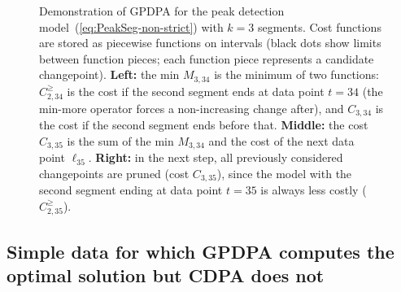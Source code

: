 \documentclass[twoside,11pt]{article}
\begin{document}
\begin{figure}[t!]
  \centering
  
\vskip -1cm
  \caption{
    Demonstration of GPDPA for the peak detection model~(\ref{eq:PeakSeg-non-strict})
    with $k=3$ segments. Cost functions are stored as piecewise
    functions on intervals (black dots show limits between function
    pieces; each function piece represents a candidate changepoint). 
    \textbf{Left:} the min \textcolor{Min}{$M_{3,34}$} is the
    minimum of two functions: \textcolor{MinMore}{$C^{\geq}_{2,34}$}
    is the cost if the second segment ends at data point $t=34$ (the
    min-more operator forces a non-increasing change after), and
    \textcolor{Ckt}{$C_{3,34}$} is the cost if the second segment ends
    before that. \textbf{Middle:} the cost \textcolor{Ckt}{$C_{3,35}$}
    is the sum of the min \textcolor{Min}{$M_{3,34}$} and the cost of
    the next data point \textcolor{Data}{$\ell_{35}$}. \textbf{Right:}
    in the next step, all previously considered changepoints are
    pruned (cost \textcolor{Ckt}{$C_{3,35}$}), since the model with the second
    segment ending at data point $t=35$ is always less costly
    (\textcolor{MinMore}{$C^{\geq}_{2,35}$}).  }
  \label{fig:min-envelope}
\end{figure}

\subsection{Simple data for which GPDPA computes the optimal solution
  but CDPA does not}
\end{document}
